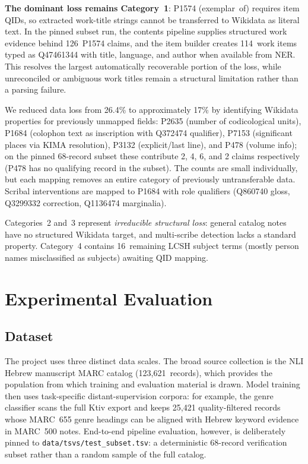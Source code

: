 \documentclass[Afour,sageh,times]{sagej}
\begin{document}
\textbf{The dominant loss remains Category~1}: P1574 (exemplar~of) requires item QIDs, so extracted work-title strings cannot be transferred to Wikidata as literal text. In the pinned subset run, the contents pipeline supplies structured work evidence behind 126~P1574 claims, and the item builder creates 114~work items typed as Q47461344 with title, language, and author when available from NER. This resolves the largest automatically recoverable portion of the loss, while unreconciled or ambiguous work titles remain a structural limitation rather than a parsing failure.

We reduced data loss from 26.4\% to approximately 17\% by identifying Wikidata properties for previously unmapped fields: P2635 (number of codicological units), P1684 (colophon text as inscription with Q372474 qualifier), P7153 (significant places via KIMA resolution), P3132 (explicit/last line), and P478 (volume info); on the pinned 68-record subset these contribute 2, 4, 6, and 2 claims respectively (P478 has no qualifying record in the subset). The counts are small individually, but each mapping removes an entire category of previously untransferable data. Scribal interventions are mapped to P1684 with role qualifiers (Q860740 gloss, Q3299332 correction, Q1136474 marginalia).

Categories~2 and~3 represent \emph{irreducible structural loss}: general catalog notes have no structured Wikidata target, and multi-scribe detection lacks a standard property. Category~4 contains 16~remaining LCSH subject terms (mostly person names misclassified as subjects) awaiting QID mapping.


\section{Experimental Evaluation}
\label{sec:evaluation}

\subsection{Dataset}

The project uses three distinct data scales. The broad source collection is the NLI Hebrew manuscript MARC catalog (123,621~records), which provides the population from which training and evaluation material is drawn. Model training then uses task-specific distant-supervision corpora: for example, the genre classifier scans the full Ktiv export and keeps 25,421 quality-filtered records whose MARC~655 genre headings can be aligned with Hebrew keyword evidence in MARC~500 notes. End-to-end pipeline evaluation, however, is deliberately pinned to \texttt{data/tsvs/test\_subset.tsv}: a deterministic 68-record verification subset rather than a random sample of the full catalog.
\end{document}
